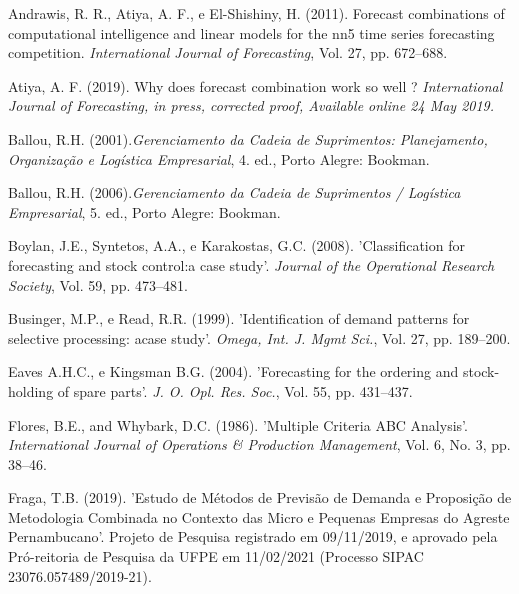 \documentclass{book}
\begin{document}
\begin{thebibliography}{12}

Andrawis, R. R., Atiya, A. F., e El-Shishiny, H. (2011). Forecast combinations of computational intelligence and linear models for the nn5 time series forecasting competition. {\it International Journal of Forecasting}, Vol. 27, pp. 672--688.

Atiya, A. F. (2019). Why does forecast combination work so well ? \it{International Journal of Forecasting}, in press, corrected proof, Available online 24 May 2019.

Ballou, R.H. (2001).{\it Gerenciamento da Cadeia de Suprimentos: Planejamento, Organização e Logística Empresarial}, 4. ed., Porto Alegre: Bookman.

Ballou, R.H. (2006).{\it Gerenciamento da Cadeia de Suprimentos / Logística Empresarial}, 5. ed., Porto Alegre: Bookman.

Boylan, J.E., Syntetos, A.A., e Karakostas, G.C. (2008). 'Classification for forecasting and stock control:a case study'. {\it Journal of the Operational Research Society}, Vol. 59, pp. 473--481.

Businger, M.P., e Read, R.R. (1999). 'Identification of demand patterns for selective processing: acase study'. {\it Omega, Int. J. Mgmt Sci.}, Vol. 27, pp. 189--200.

Eaves A.H.C., e Kingsman B.G. (2004). 'Forecasting for the ordering and stock-holding of spare parts'. {\it J. O. Opl. Res. Soc.}, Vol. 55, pp. 431--437.

Flores, B.E., and Whybark, D.C. (1986). 'Multiple Criteria ABC Analysis'. {\it International Journal of Operations \& Production Management}, Vol. 6, No. 3, pp. 38--46.

Fraga, T.B. (2019). 'Estudo de Métodos de Previsão de Demanda e Proposição de Metodologia Combinada no Contexto das Micro e Pequenas Empresas do Agreste Pernambucano'. Projeto de Pesquisa registrado em 09/11/2019, e aprovado pela Pró-reitoria de Pesquisa da UFPE em 11/02/2021 (Processo SIPAC 23076.057489/2019-21).


\end{thebibliography}
\end{document}

